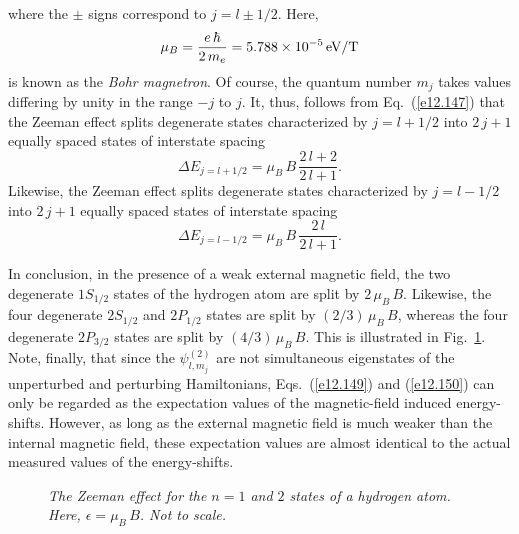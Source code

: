 where the $\pm$ signs correspond to $j=l\pm 1/2$. Here,
\begin{equation}
\mu_B = \frac{e\,\hbar}{2\,m_e} = 5.788\times 10^{-5}\,{\rm eV/T}
\end{equation}
is known as the {\em Bohr magnetron}. Of course, the quantum number $m_j$ takes values differing by unity in the range $-j$ to $j$. It, thus,
follows from Eq.~(\ref{e12.147}) that the Zeeman effect splits
degenerate states characterized by $j=l+1/2$ into $2\,j+1$
equally spaced states of interstate spacing
\begin{equation}\label{e12.149}
\Delta E_{j=l+1/2} = \mu_B\,B\,\frac{2\,l+2}{2\,l+1}.
\end{equation}
Likewise, the Zeeman effect splits degenerate states characterized by
$j=l-1/2$ into $2\,j+1$ equally spaced states of interstate spacing
\begin{equation}\label{e12.150}
\Delta E_{j=l-1/2} = \mu_B\,B\,\frac{2\,l}{2\,l+1}.
\end{equation}

In conclusion, in the presence of a weak external magnetic field, the two degenerate $1S_{1/2}$
states of the hydrogen atom are split by $2\,\mu_B\,B$. Likewise,
the four degenerate  $2S_{1/2}$ and $2P_{1/2}$ states are split by
$(2/3)\,\mu_B\,B$, whereas the four degenerate $2P_{3/2}$ states
are split by $(4/3)\,\mu_B\,B$. This is illustrated in Fig.~\ref{fzee}.
Note, finally, that since the $\psi^{(2)}_{l,m_j}$ are not simultaneous
eigenstates of the unperturbed and perturbing Hamiltonians, 
Eqs.~(\ref{e12.149}) and (\ref{e12.150}) can only be regarded as the expectation
values of the magnetic-field induced energy-shifts. However, as long as
the external magnetic field is much weaker than the internal magnetic
field, these expectation  values are almost identical to the actual
measured values of the energy-shifts.

\begin{figure}
\epsfysize=3.5in
\centerline{}
\caption{\em The Zeeman effect for the
$n=1$ and $2$ states of a hydrogen atom. Here, $\epsilon= \mu_B\,B$. Not to scale.}\label{fzee}   
\end{figure}

